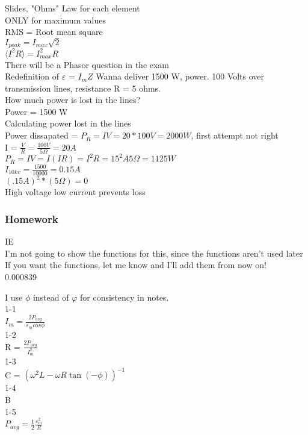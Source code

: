 \documentclass{article}
\begin{document}
\vspace{2mm}

\noindent
Slides, "Ohms" Law for each element \\
ONLY for maximum values \\
RMS = Root mean square \\
$I_{peak} = I_{max}\sqrt{2} $ \\
$\langle I^2 R \rangle = I_{max}^2 R$ \\
There will be a Phasor question in the exam \\
Redefinition of $\varepsilon$ = $I_m Z$
Wanna deliver 1500 W, power. 100 Volts over transmission lines, resistance R = 5 ohms. \\
How much power is lost in the lines? \\
Power = 1500 W \\
Calculating power lost in the lines \\
Power dissapated = $P_R = IV = 20 * 100 V = 2000W$, first attempt not right \\
I = $\frac{V}{R} = \frac{100V}{5 \Omega} = 20 A$ \\
$P_R = IV = I(IR) = I^2R = 15^2A 5 \Omega = 1125W$ \\
$I_{10kv} = \frac{1500}{10000} = 0.15A$ \\
$(.15A)^2 * (5 \Omega) = 0$ \\
High voltage low current prevents loss 

\subsubsection{Homework}
\noindent
IE \\
I'm not going to show the functions for this, since the functions aren't used later \\
If you want the functions, let me know and I'll add them from now on! \\
0.000839 

\vspace{2mm}

\noindent
I use $\phi$ instead of $\varphi$ for consistency in notes. \\
1-1 \\
$I_m = \frac{2 P_{avg}}{\varepsilon_m cos \phi}$ \\
1-2 \\
R = $\frac{2 P_{avg}}{I_m^2}$ \\
1-3 \\
C = $(\omega^2 L - \omega R \tan(-\phi))^{-1}$ \\
1-4 \\
B \\
1-5 \\
$P_{avg} = \frac{1}{2} \frac{\varepsilon_m^2}{R}$
\end{document}
